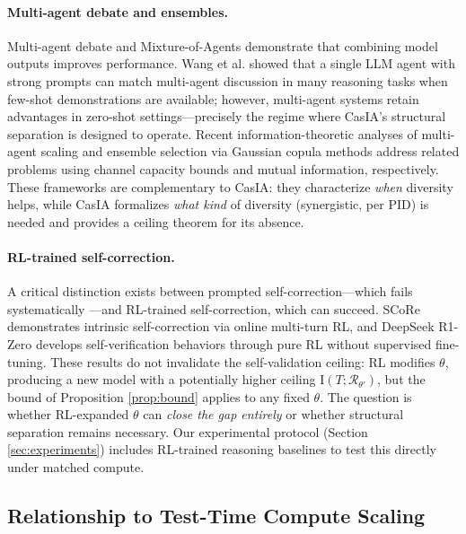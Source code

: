 \documentclass[11pt,a4paper]{article}
\theoremstyle{remark}
\newcommand{\MI}{\mathrm{I}}
\begin{document}
\paragraph{Multi-agent debate and ensembles.} Multi-agent debate \cite{du2023debate,liang2024debate} and Mixture-of-Agents \cite{wang2025moa} demonstrate that combining model outputs improves performance. Wang et al. \cite{wang2024rethinking} showed that a single LLM agent with strong prompts can match multi-agent discussion in many reasoning tasks when few-shot demonstrations are available; however, multi-agent systems retain advantages in zero-shot settings---precisely the regime where CasIA's structural separation is designed to operate. Recent information-theoretic analyses of multi-agent scaling \cite{agentscaling2026} and ensemble selection via Gaussian copula methods \cite{gcmi2026} address related problems using channel capacity bounds and mutual information, respectively. These frameworks are complementary to CasIA: they characterize \emph{when} diversity helps, while CasIA formalizes \emph{what kind} of diversity (synergistic, per PID) is needed and provides a ceiling theorem for its absence.

\paragraph{RL-trained self-correction.} A critical distinction exists between prompted self-correction---which fails systematically \cite{huang2024selfcorrection,kamoi2024selfcorrection}---and RL-trained self-correction, which can succeed. SCoRe \cite{kumar2025score} demonstrates intrinsic self-correction via online multi-turn RL, and DeepSeek R1-Zero \cite{deepseek2025r1} develops self-verification behaviors through pure RL without supervised fine-tuning. These results do not invalidate the self-validation ceiling: RL modifies $\theta$, producing a new model with a potentially higher ceiling $\MI(T; \mathcal{R}_{\theta'})$, but the bound of Proposition \ref{prop:bound} applies to any fixed $\theta$. The question is whether RL-expanded $\theta$ can \emph{close the gap entirely} or whether structural separation remains necessary. Our experimental protocol (Section \ref{sec:experiments}) includes RL-trained reasoning baselines to test this directly under matched compute.

\subsection{Relationship to Test-Time Compute Scaling}
\end{document}
